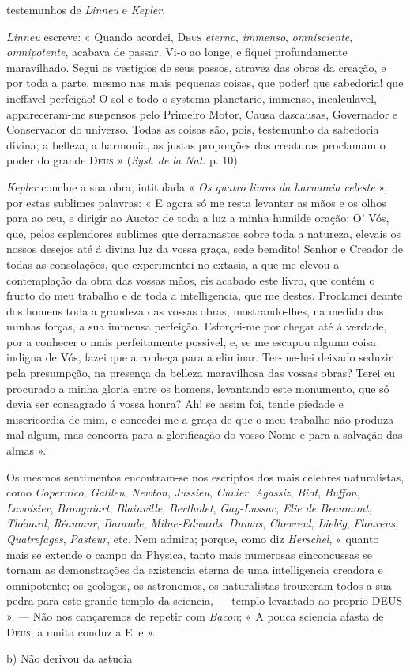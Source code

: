 testemunhos de \emph{Linneu} e \emph{Kepler}.\par \emph{Linneu} escreve: « Quando acordei, \textsc{Deus} \emph{eterno}, \emph{immenso}, \emph{omnisciente}, \emph{omnipotente}, acabava de passar. Vi-o ao longe, e fiquei profundamente maravilhado. Segui os vestigios de seus passos, atravez das obras da creação, e por toda a parte, mesmo nas mais pequenas coisas, que poder! que sabedoria! que ineffavel perfeição! O sol e todo o systema planetario, immenso, incalculavel, appareceram-me suspensos pelo Primeiro Motor, Causa dascausas, Governador e Conservador do universo. Todas as coisas são, pois, testemunho da sabedoria divina; a belleza, a harmonia, as justas proporções das creaturas proclamam o poder do grande \textsc{Deus} » (\emph{Syst}. \emph{de la Nat}. p. 10).\par \emph{Kepler} conclue a sua obra, intitulada « \emph{Os quatro livros da harmonia celeste} », por estas sublimes palavras: « E agora só me resta levantar as mãos e os olhos para ao ceu, e dirigir ao Auctor de toda a luz a minha humilde oração: O' Vós, que, pelos esplendores sublimes que derramastes sobre toda a natureza, elevais os nossos desejos até á divina luz da vossa graça, sede bemdito! Senhor e Creador de todas as consolações, que experimentei no extasis, a que me elevou a contemplação da obra das vossas mãos, eis acabado este livro, que contém o fructo do meu trabalho e de toda a intelligencia, que me destes. Proclamei deante dos homens toda a grandeza das vossas obras, mostrando-lhes, na medida das minhas forças, a sua immensa perfeição. Esforçei-me por chegar até á verdade, por a conhecer o mais perfeitamente possivel, e, se me escapou alguma coisa indigna de Vós, fazei que a conheça para a eliminar. Ter-me-hei deixado seduzir pela presumpção, na presença da belleza maravilhosa das vossas obras? Terei eu procurado a minha gloria entre os homens, levantando este monumento, que só devia ser consagrado á vossa honra? Ah! se assim foi, tende piedade e misericordia de mim, e concedei-me a graça de que o meu trabalho não produza mal algum, mas concorra para a glorificação do vosso Nome e para a salvação das almas ».\par Os mesmos sentimentos encontram-se nos escriptos dos mais celebres naturalistas, como \emph{Copernico}, \emph{Galileu}, \emph{Newton}, \emph{Jussieu}, \emph{Cuvier}, \emph{Agassiz}, \emph{Biot}, \emph{Buffon}, \emph{Lavoisier}, \emph{Brongniart}, \emph{Blainville}, \emph{Bertholet}, \emph{Gay-Lussac}, \emph{Elie de Beaumont}, \emph{Thénard}, \emph{Réaumur}, \emph{Barande}, \emph{Milne-Edwards}, \emph{Dumas}, \emph{Chevreul}, \emph{Liebig}, \emph{Flourens}, \emph{Quatrefages}, \emph{Pasteur}, etc. Nem admira; porque, como diz \emph{Herschel}, « quanto mais se extende o campo da Physica, tanto mais numerosas einconcussas se tornam as demonstrações da existencia eterna de uma intelligencia creadora e omnipotente; os geologos, os astronomos, os naturalistas trouxeram todos a sua pedra para este grande templo da sciencia, --- templo levantado ao proprio \textsc{DEUS} ». --- Não nos cançaremos de repetir com \emph{Bacon}; « A pouca sciencia afasta de \textsc{Deus}, a muita conduz a Elle ».\par b) Não derivou da astucia 